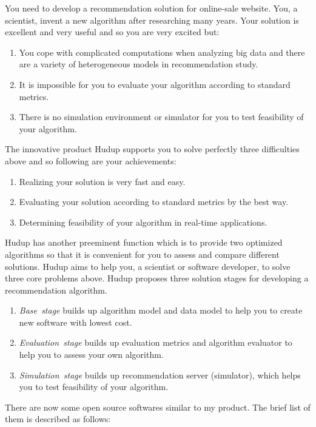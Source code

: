 \documentclass[a4paper,twoside]{article}
\begin{document}
You need to develop a recommendation solution for online-sale website. You, a scientist, invent a new algorithm after researching many years. Your solution is excellent and very useful and so you are very excited but:
\begin{enumerate}
\item You cope with complicated computations when analyzing big data and there are a variety of heterogeneous models in recommendation study.
\item It is impossible for you to evaluate your algorithm according to standard metrics.
\item There is no simulation environment or simulator for you to test feasibility of your algorithm.
\end{enumerate}
The innovative product Hudup supports you to solve perfectly three difficulties above and so following are your achievements:
\begin{enumerate}
\item Realizing your solution is very fast and easy.
\item Evaluating your solution according to standard metrics by the best way.
\item Determining feasibility of your algorithm in real-time applications.
\end{enumerate}
Hudup has another preeminent function which is to provide two optimized algorithms so that it is convenient for you to assess and compare different solutions. Hudup aims to help you, a scientist or software developer, to solve three core problems above. Hudup proposes three solution stages for developing a recommendation algorithm.
\begin{enumerate}
\item \textit{Base~stage} builds up algorithm model and data model to help you to create new software with lowest cost.
\item \textit{Evaluation~stage} builds up evaluation metrics and algorithm evaluator to help you to assess your own algorithm.
\item \textit{Simulation~stage} builds up recommendation server (simulator), which helps you to test feasibility of your algorithm.
\end{enumerate}
There are now some open source softwares similar to my product. The brief list of them is described as follows:
\end{document}

